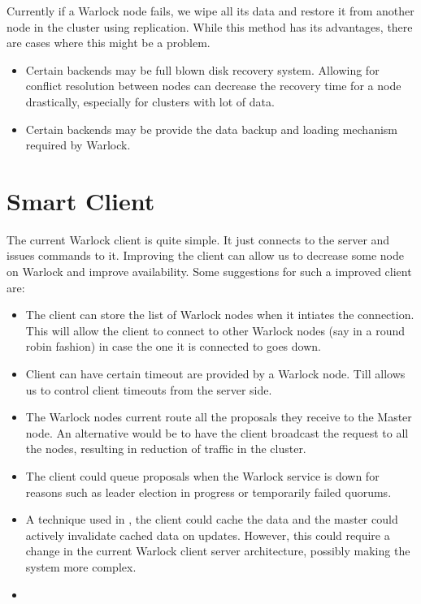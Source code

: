 Currently if a Warlock node fails, we wipe all its data and restore it from
another node in the cluster using replication. While this method has its
advantages, there are cases where this might be a problem.

\begin{itemize}
  \item Certain backends may be full blown disk recovery system. Allowing for
    conflict resolution between nodes can decrease the recovery time for a
    node drastically, especially for clusters with lot of data.
  \item Certain backends may be provide the data backup and loading mechanism
    required by Warlock.
\end{itemize}

\section{Smart Client}

The current Warlock client is quite simple. It just connects to the server and
issues commands to it. Improving the client can allow us to decrease some
node on Warlock and improve availability. Some suggestions for such a improved
client are:

\begin{itemize}
  \item The client can store the list of Warlock nodes when it intiates the
    connection. This will allow the client to connect to other Warlock nodes
    (say in a round robin fashion) in case the one it is connected to goes down.
  \item Client can have certain timeout are provided by a Warlock node. Till
    allows us to control client timeouts from the server side.
  \item The Warlock nodes current route all the proposals they receive to the
    Master node. An alternative would be to have the client broadcast the
    request to all the nodes, resulting in reduction of traffic in the cluster.
  \item The client could queue proposals when the Warlock service is down for
    reasons such as leader election in progress or temporarily failed quorums.
  \item A technique used in \citet{Burrows06}, the client could cache the data
    and the master could actively invalidate cached data on updates. However,
    this could require a change in the current Warlock client server
    architecture, possibly making the system more complex.
  \item 
\end{itemize}

